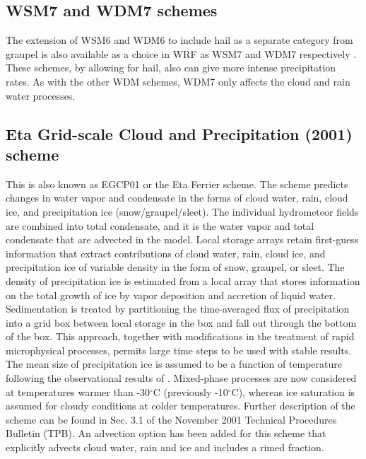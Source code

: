 \subsection{WSM7 and WDM7 schemes}

The extension of WSM6 and WDM6 to include hail as a separate category from graupel is also available as a choice in WRF as WSM7 and WDM7 respectively \citep{bae18}. 
These schemes, by allowing for hail, also can give more intense precipitation rates. As with the other WDM schemes, WDM7 only affects the cloud and rain water processes.

\subsection{Eta Grid-scale Cloud and Precipitation (2001) scheme}

This is also known as EGCP01 or the Eta Ferrier scheme. The scheme predicts changes 
in water vapor and condensate in the forms of cloud water, rain, cloud 
ice, and precipitation ice (snow/graupel/sleet).  The individual hydrometeor 
fields are combined into total condensate, and it is the water vapor 
and total condensate that are advected in the model. 
Local storage arrays retain first-guess information that extract 
contributions of cloud water, rain, cloud ice, and precipitation ice of 
variable density in the form of snow, graupel, or sleet. The density of 
precipitation ice is estimated from a local array that stores information 
on the total growth of ice by vapor deposition and accretion of liquid water. 
Sedimentation is treated by partitioning the time-averaged flux of 
precipitation into a grid box between local storage in the box and 
fall out through the bottom of the box. This approach, together with 
modifications in the treatment of rapid microphysical processes, permits 
large time steps to be used with stable results. The mean size of 
precipitation ice is assumed to be a function of temperature following 
the observational results of \citet{ryan96}. Mixed-phase processes are 
now considered at temperatures warmer than -30$^\circ$C (previously 
-10$^\circ$C), 
whereas ice saturation 
is assumed for cloudy conditions at colder temperatures. Further 
description of the scheme can be found in Sec. 3.1 of the November 
2001 Technical Procedures Bulletin (TPB). 
An advection option has been added for this scheme that explicitly advects cloud water, rain and ice
and includes a rimed fraction.

